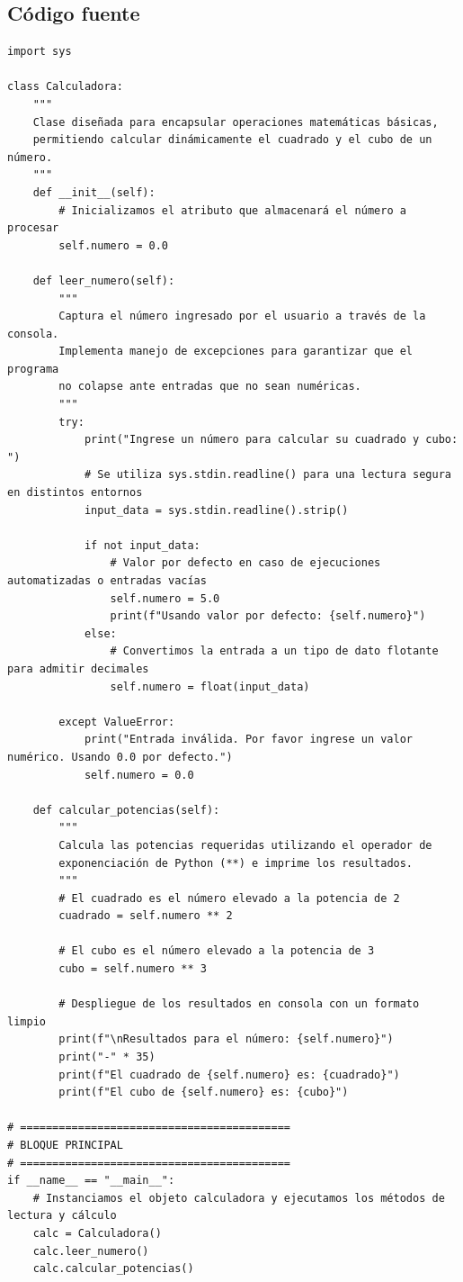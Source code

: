 \documentclass[11pt, a4paper]{article}
\begin{document}
\subsection{Código fuente}
\begin{lstlisting}
import sys

class Calculadora:
    """
    Clase diseñada para encapsular operaciones matemáticas básicas,
    permitiendo calcular dinámicamente el cuadrado y el cubo de un número.
    """
    def __init__(self):
        # Inicializamos el atributo que almacenará el número a procesar
        self.numero = 0.0

    def leer_numero(self):
        """
        Captura el número ingresado por el usuario a través de la consola.
        Implementa manejo de excepciones para garantizar que el programa
        no colapse ante entradas que no sean numéricas.
        """
        try:
            print("Ingrese un número para calcular su cuadrado y cubo: ")
            # Se utiliza sys.stdin.readline() para una lectura segura en distintos entornos
            input_data = sys.stdin.readline().strip()
            
            if not input_data:
                # Valor por defecto en caso de ejecuciones automatizadas o entradas vacías
                self.numero = 5.0  
                print(f"Usando valor por defecto: {self.numero}")
            else:
                # Convertimos la entrada a un tipo de dato flotante para admitir decimales
                self.numero = float(input_data)
                
        except ValueError:
            print("Entrada inválida. Por favor ingrese un valor numérico. Usando 0.0 por defecto.")
            self.numero = 0.0

    def calcular_potencias(self):
        """
        Calcula las potencias requeridas utilizando el operador de 
        exponenciación de Python (**) e imprime los resultados.
        """
        # El cuadrado es el número elevado a la potencia de 2
        cuadrado = self.numero ** 2
        
        # El cubo es el número elevado a la potencia de 3
        cubo = self.numero ** 3
        
        # Despliegue de los resultados en consola con un formato limpio
        print(f"\nResultados para el número: {self.numero}")
        print("-" * 35)
        print(f"El cuadrado de {self.numero} es: {cuadrado}")
        print(f"El cubo de {self.numero} es: {cubo}")

# ==========================================
# BLOQUE PRINCIPAL
# ==========================================
if __name__ == "__main__":
    # Instanciamos el objeto calculadora y ejecutamos los métodos de lectura y cálculo
    calc = Calculadora()
    calc.leer_numero()
    calc.calcular_potencias()
\end{lstlisting}
\end{document}
